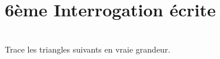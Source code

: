


\pagestyle{empty}
\section*{6ème Interrogation écrite}

\\
Trace les triangles suivants en vraie grandeur.\\
[Contenu des triangles...]
